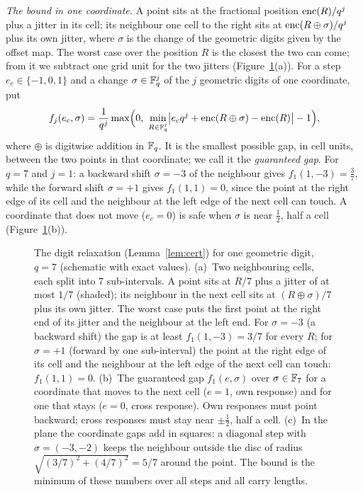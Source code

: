 \emph{The bound in one coordinate.} A point sits at the fractional position $\operatorname{enc}(R)/q^j$ plus a jitter in its cell; its neighbour one cell to the right sits at $\operatorname{enc}(R\oplus\sigma)/q^j$ plus its own jitter, where $\sigma$ is the change of the geometric digits given by the offset map. The worst case over the position $R$ is the closest the two can come; from it we subtract one grid unit for the two jitters (Figure~\ref{fig:cert}(a)). For a step $e_c\in\{-1,0,1\}$ and a change $\sigma\in\mathbb{F}_q^j$ of the $j$ geometric digits of one coordinate, put
\[
f_j(e_c,\sigma)=\frac1{q^j}\max\Bigl(0,\ \min_{R\in\F_q^j}\bigl|e_cq^j+\enc(R\oplus\sigma)-\enc(R)\bigr|-1\Bigr),
\]
where $\oplus$ is digitwise addition in $\mathbb{F}_q$. It is the smallest possible gap, in cell units, between the two points in that coordinate; we call it the \emph{guaranteed gap}. For $q=7$ and $j=1$: a backward shift $\sigma=-3$ of the neighbour gives $f_1(1,-3)=\frac37$, while the forward shift $\sigma=+1$ gives $f_1(1,1)=0$, since the point at the right edge of its cell and the neighbour at the left edge of the next cell can touch. A coordinate that does not move ($e_c=0$) is safe when $\sigma$ is near $\frac12$, half a cell (Figure~\ref{fig:cert}(b)).

\begin{figure}[t]
\centering
{}
\caption{The digit relaxation (Lemma~\ref{lem:cert}) for one geometric digit, $q=7$ (schematic with exact values). (a)~Two neighbouring cells, each split into $7$ sub-intervals. A point sits at $R/7$ plus a jitter of at most $1/7$ (shaded); its neighbour in the next cell sits at $(R\oplus\sigma)/7$ plus its own jitter. The worst case puts the first point at the right end of its jitter and the neighbour at the left end. For $\sigma=-3$ (a backward shift) the gap is at least $f_1(1,-3)=3/7$ for every $R$; for $\sigma=+1$ (forward by one sub-interval) the point at the right edge of its cell and the neighbour at the left edge of the next cell can touch: $f_1(1,1)=0$. (b)~The guaranteed gap $f_1(e,\sigma)$ over $\sigma\in\mathbb{F}_7$ for a coordinate that moves to the next cell ($e=1$, own response) and for one that stays ($e=0$, cross response). Own responses must point backward; cross responses must stay near $\pm\frac12$, half a cell. (c)~In the plane the coordinate gaps add in squares: a diagonal step with $\sigma=(-3,-2)$ keeps the neighbour outside the disc of radius $\sqrt{(3/7)^2+(4/7)^2}=5/7$ around the point. The bound is the minimum of these numbers over all steps and all carry lengths.}
\label{fig:cert}
\end{figure}

